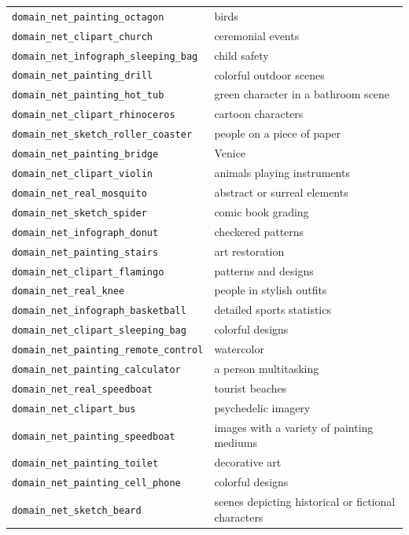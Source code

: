 \documentclass{article} %
\begin{document}
\begin{longtable}{p{} p{}}
\texttt{domain\_net\_painting\_octagon} & birds \\
\texttt{domain\_net\_clipart\_church} & ceremonial events \\
\texttt{domain\_net\_infograph\_sleeping\_bag} & child safety \\
\texttt{domain\_net\_painting\_drill} & colorful outdoor scenes \\
\texttt{domain\_net\_painting\_hot\_tub} & green character in a bathroom scene \\
\texttt{domain\_net\_clipart\_rhinoceros} & cartoon characters \\
\texttt{domain\_net\_sketch\_roller\_coaster} & people on a piece of paper \\
\texttt{domain\_net\_painting\_bridge} & Venice \\
\texttt{domain\_net\_clipart\_violin} & animals playing instruments \\
\texttt{domain\_net\_real\_mosquito} & abstract or surreal elements \\
\texttt{domain\_net\_sketch\_spider} & comic book grading \\
\texttt{domain\_net\_infograph\_donut} & checkered patterns \\
\texttt{domain\_net\_painting\_stairs} & art restoration \\
\texttt{domain\_net\_clipart\_flamingo} & patterns and designs \\
\texttt{domain\_net\_real\_knee} & people in stylish outfits \\
\texttt{domain\_net\_infograph\_basketball} & detailed sports statistics \\
\texttt{domain\_net\_clipart\_sleeping\_bag} & colorful designs \\
\texttt{domain\_net\_painting\_remote\_control} & watercolor \\
\texttt{domain\_net\_painting\_calculator} & a person multitasking \\
\texttt{domain\_net\_real\_speedboat} & tourist beaches \\
\texttt{domain\_net\_clipart\_bus} & psychedelic imagery \\
\texttt{domain\_net\_painting\_speedboat} & images with a variety of painting mediums \\
\texttt{domain\_net\_painting\_toilet} & decorative art \\
\texttt{domain\_net\_painting\_cell\_phone} & colorful designs \\
\texttt{domain\_net\_sketch\_beard} & scenes depicting historical or fictional characters \\

\end{longtable}
\end{document}
